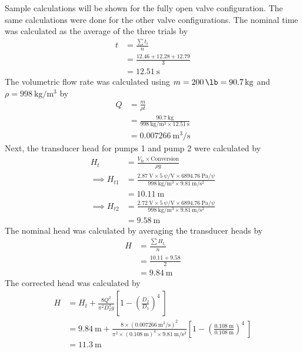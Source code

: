 Sample calculations will be shown for the fully open valve configuration. The same calculations were done for the other valve configurations. The nominal time was calculated as the average of the three trials by 
\begin{align*}
    t &= \frac{\sum t_i}{n} \\
    &= \frac{12.46 + 12.28 + 12.79}{3} \\
    &= \qty{12.51}{\second}
\end{align*}
The volumetric flow rate was calculated using $m = \qty{200}{\lb} = \qty{90.7}{\kilo\gram}$ and $\rho = \qty{998}{\kilo\gram\per\meter\cubed}$ by
\begin{align*}
    Q &= \frac{m}{\rho t} \\
    &= \frac{\qty{90.7}{\kilo\gram}}{\qty{998}{\kilo\gram\per\meter\cubed} \times \qty{12.51}{\second}} \\
    &= \qty{0.007266}{\meter\cubed\per\second}
\end{align*}
Next, the transducer head for pumps 1 and pump 2 were calculated by
\begin{align*}
    H_{t} &= \frac{V_{\text{tr}} \times \text{Conversion}}{\rho g} \\
    \implies H_{t1} &= \frac{\qty{2.87}{\volt} \times \qty{5}{\psi\per\volt} \times \qty{6894.76}{\pascal\per\psi}}{\qty{998}{\kilo\gram\per\meter\cubed} \times \qty{9.81}{\meter\per\second\squared}} \\
    &= \qty{10.11}{\meter} \\
    \implies H_{t2} &= \frac{\qty{2.72}{\volt} \times \qty{5}{\psi\per\volt} \times \qty{6894.76}{\pascal\per\psi}}{\qty{998}{\kilo\gram\per\meter\cubed} \times \qty{9.81}{\meter\per\second\squared}} \\
    &= \qty{9.58}{\meter}
\end{align*}
The nominal head was calculated by averaging the transducer heads by
\begin{align*}
    H &= \frac{\sum H_{t_i}}{n} \\
    &= \frac{10.11 + 9.58}{2} \\
    &= \qty{9.84}{\meter}
\end{align*}
The corrected head was calculated by
\begin{align*}
    H &= H_t + \frac{8Q^2}{\pi^2 D_2^4 g} \left[1 - \left(\frac{D_2}{D_1}\right)^4\ \right] \\
    &= \qty{9.84}{\meter} + \frac{8 \times (\qty{0.007266}{\meter\cubed\per\second})^2}{\pi^2 \times (\qty{0.108}{\meter})^4 \times \qty{9.81}{\meter\per\second\squared}} \left[1 - \left(\frac{\qty{0.108}{\meter}}{\qty{0.108}{\meter}}\right)^4\ \right] \\
    &= \qty{11.3}{\meter}
\end{align*}

